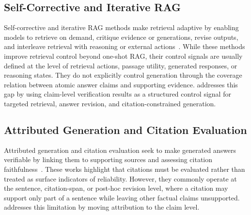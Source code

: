 \subsection{Self-Corrective and Iterative RAG}
\label{subsec:related_self_corrective}

Self-corrective and iterative RAG methods make retrieval adaptive by enabling models to retrieve on demand, critique evidence or generations, revise outputs, and interleave retrieval with reasoning or external actions~\cite{asai2024self,yan2024corrective,shao2023enhancing,trivedi2023interleaving,yao2023react}. While these methods improve retrieval control beyond one-shot RAG, their control signals are usually defined at the level of retrieval actions, passage utility, generated responses, or reasoning states. They do not explicitly control generation through the coverage relation between atomic answer claims and supporting evidence. \ragname addresses this gap by using claim-level verification results as a structured control signal for targeted retrieval, answer revision, and citation-constrained generation.

\subsection{Attributed Generation and Citation Evaluation}
\label{subsec:related_attribution}

Attributed generation and citation evaluation seek to make generated answers verifiable by linking them to supporting sources and assessing citation faithfulness~\cite{bohnet2022attributed,gao2023enabling,gao2023rarr}. These works highlight that citations must be evaluated rather than treated as surface indicators of reliability. However, they commonly operate at the sentence, citation-span, or post-hoc revision level, where a citation may support only part of a sentence while leaving other factual claims unsupported. \ragname addresses this limitation by moving attribution to the claim level.


